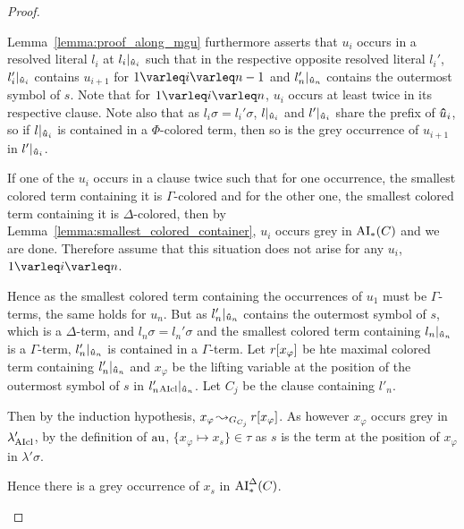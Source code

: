 \documentclass[,%
	draft=false,%
	numbers=noendperiod
	11pt,
	a4paper,
	oneside,%
	openany,
]{memoir}
\begin{document}
\begin{proof}
\begin{description}
\begin{enumerate}
					Lemma~\ref{lemma:proof_along_mgu} furthermore asserts that $u_i$ occurs in a resolved literal $l_i$ at $l_i|_{\bm\hat u_i}$ such that in the respective opposite resolved literal $l_i'$, $l_i'|_{\bm\hat u_i}$ contains $u_{i+1}$ for $1\varleq i\varleq n-1$ and $l_n'|_{\bm\hat u_n}$ contains the outermost symbol of $s$.
					Note that for $1\varleq i \varleq n$, $u_i$ occurs at least twice in its respective clause.
					Note also that as $l_i\sigma = l_i'\sigma$, $l|_{\bm\hat u_i}$ and $l'|_{\bm\hat u_i}$ share the prefix of $\bm\hat u_i$, so if $l|_{\bm\hat u_i}$ is contained in a $\Phi$-colored term, then so is the grey occurrence of $u_{i+1}$ in $l'|_{\bm\hat u_i}$.

					If one of the $u_i$ occurs in a clause twice such that for one occurrence, the smallest colored term containing it is $\Gamma$-colored and for the other one, the smallest colored term containing it is $\Delta$-colored, then by Lemma~\ref{lemma:smallest_colored_container}, $u_i$ occurs grey in $\operatorname{AI}_\mathrm{*}(C)$ and we are done.
					Therefore assume that this situation does not arise for any $u_i$, $1\varleq i \varleq n$.

					Hence as the smallest colored term containing the occurrences of $u_1$ must be $\Gamma$-terms, the same holds for $u_n$.
					But as $l'_n|_{ \bm\hat u_n }$ contains the outermost symbol of $s$, which is a $\Delta$-term, and $l_n\sigma = l_n'\sigma$ and the smallest colored term containing $l_n|_{ \bm\hat u_n }$ is a $\Gamma$-term,
					$l'_n|_{ \bm\hat u_n }$ is contained in a $\Gamma$-term.
					Let $r[x_\varphi]$ be hte maximal colored term containing $l'_n|_{ \bm\hat u_n }$ and $x_\varphi$ be the lifting variable at the position of the outermost symbol of $s$ in $l'_n{}_{\operatorname{AIcl}}|_{ \bm\hat u_n }$.
					Let $C_j$ be the clause containing $l'_n$.

					Then by the induction hypothesis, $x_\varphi \operatorname{\leadsto}_{G_{C_j}} r[x_\varphi]$.
					As however $x_\varphi$ occurs grey in $\lambda'_{\operatorname{AIcl}}$, by the definition of $\operatorname{au}$, $\{x_\varphi \mapsto x_s\} \in \tau$
					as $s$ is the term at the position of $x_\varphi$ in $\lambda'\sigma$.

					Hence there is a grey occurrence of $x_s$ in $\operatorname{AI}_\mathrm{*}^\Delta(C)$.


					\begin{comment}

						Hence if there is a grey occurrence of $u$, we are done, so suppose $u$ only occurs colored in $C_1$.


\end{comment}
\end{enumerate}
\end{description}
\end{proof}
\end{document}
